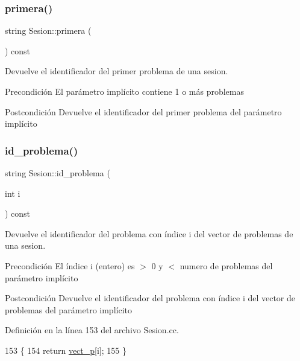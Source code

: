 \subsubsection{\texorpdfstring{primera()}{primera()}}
{\footnotesize\ttfamily string Sesion\+::primera (\begin{DoxyParamCaption}{ }\end{DoxyParamCaption}) const}



Devuelve el identificador del primer problema de una sesion. 

\begin{DoxyPrecond}{Precondición}
El parámetro implícito contiene 1 o más problemas 
\end{DoxyPrecond}
\begin{DoxyPostcond}{Postcondición}
Devuelve el identificador del primer problema del parámetro implícito 
\end{DoxyPostcond}
\mbox{\label{class_sesion_ae0bb567c32173fab7938766f4dd0fb1a}} 
\subsubsection{\texorpdfstring{id\+\_\+problema()}{id\_problema()}}
{\footnotesize\ttfamily string Sesion\+::id\+\_\+problema (\begin{DoxyParamCaption}\item[{int}]{i }\end{DoxyParamCaption}) const}



Devuelve el identificador del problema con índice i del vector de problemas de una sesion. 

\begin{DoxyPrecond}{Precondición}
El índice i (entero) es $>$ 0 y $<$ numero de problemas del parámetro implícito 
\end{DoxyPrecond}
\begin{DoxyPostcond}{Postcondición}
Devuelve el identificador del problema con índice i del vector de problemas del parámetro implícito 
\end{DoxyPostcond}


Definición en la línea 153 del archivo Sesion.\+cc.


\begin{DoxyCode}
153                                             \{
154         \textcolor{keywordflow}{return} \mbox{\hyperlink{class_sesion_ab9459a157fdb5e1c2f975ba20305ae8f}{vect\_p}}[i];
155       \}
\end{DoxyCode}
\mbox{\label{class_sesion_a32dcea163badd79a3ffe111957741de9}} 
